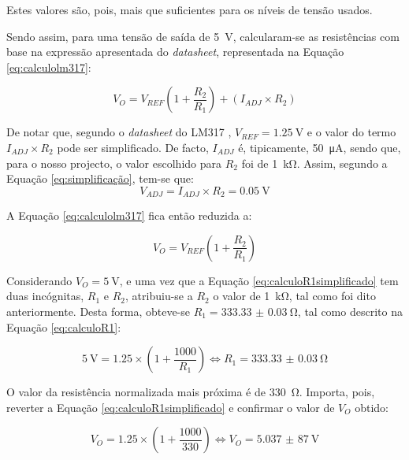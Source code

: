 Estes valores são, pois, mais que suficientes para os níveis de tensão usados.

Sendo assim, para uma tensão de saída de \SI{5}{\volt}, calcularam-se as resistências com base na expressão apresentada do \textit{datasheet}, representada na Equação \ref{eq:calculolm317}: 

\begin{equation} \label{eq:calculolm317}
	V_{O} = V_{REF} (1 + \frac{R_{2}}{R_{1}}) + (I_{ADJ} \times R_{2})
\end{equation}

De notar que, segundo o \textit{datasheet} do LM317 \cite{LM317}, $V_{REF} = \SI{1.25}{\volt}$ e o valor do termo $I_{ADJ} \times R_{2}$ pode ser simplificado. De facto, $I_{ADJ}$ é, tipicamente, \SI{50}{\micro\ampere}, sendo que, para o nosso projecto, o valor escolhido para $R_{2}$ foi de \SI{1}{\kilo\ohm}. Assim, segundo a Equação \ref{eq:simplificação}, tem-se que:
\begin{equation} \label{eq:simplificação}
	V_{ADJ} = I_{ADJ} \times R_{2} = \SI{0.05}{\volt}
\end{equation}

A Equação \ref{eq:calculolm317} fica então reduzida a:

\begin{equation} \label{eq:calculoR1simplificado}
	V_{O} = V_{REF} (1 + \frac{R_{2}}{R_{1}})
\end{equation}

Considerando $V_{O} = \SI{5}{\volt}$, e uma vez que a Equação \ref{eq:calculoR1simplificado} tem duas incógnitas, $R_{1}$ e $R_{2}$, atribuiu-se a $R_{2}$ o valor de \SI{1}{\kilo\ohm}, tal como foi dito anteriormente. Desta forma, obteve-se $R_{1} = \SI{333.33(3)}{\ohm}$, tal como descrito na Equação \ref{eq:calculoR1}: 

\begin{equation} \label{eq:calculoR1}
	\SI{5}{\volt} = 1.25 \times (1 + \frac{1000}{R_{1}}) \Leftrightarrow R_{1} = \SI{333.33(3)}{\ohm}
\end{equation}

O valor da resistência normalizada mais próxima é de \SI{330}{\ohm}. Importa, pois, reverter a Equação \ref{eq:calculoR1simplificado} e confirmar o valor de  $V_{O}$ obtido:

\begin{equation} \label{eq:confirmacaoVout}
	V_{O} = 1.25 \times (1 + \frac{1000}{330}) \Leftrightarrow V_{O} = \SI{5,037(87)}{\volt}
\end{equation}

